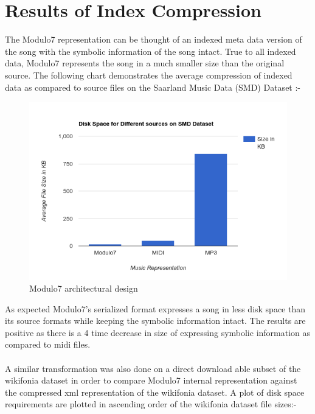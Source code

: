 \section{Results of Index Compression}

\noindent The Modulo7 representation can be thought of an indexed meta data version of the song with the symbolic information of the song intact. True to all indexed data, Modulo7 represents the song in a much smaller size than the original source. The following chart demonstrates the average compression of indexed data as compared to source files on the Saarland Music Data (SMD) Dataset \cite{saarlandmsd}:-
\begin{figure}
\centering
\includegraphics[width=\textwidth]{Modulo7SMDBarGraph.png}
\makeatletter
\let\@currsize\normalsize
\caption{Modulo7 architectural design}
\label{fig:figure}
\end{figure}
As expected Modulo7's serialized format expresses a song in less disk space than its source formats while keeping the symbolic information intact. The results are positive as there is a 4 time decrease in size of expressing symbolic information as compared to midi files. \\\\
A similar transformation was also done on a direct download able subset of the wikifonia dataset in order to compare Modulo7 internal representation against the compressed xml representation of the wikifonia dataset. A plot of disk space requirements are plotted in ascending order of the wikifonia dataset file sizes:- 
